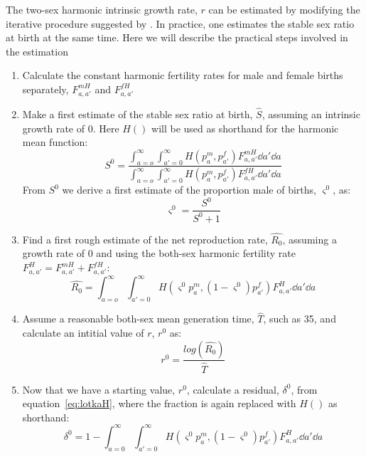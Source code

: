 The two-sex harmonic intrinsic growth rate, $r$ can be estimated by modifying
the iterative procedure suggested by \citet{coale1957new}. In practice, one
estimates the stable sex ratio at birth at the same time. Here we will describe
the practical steps involved in the estimation

\begin{enumerate}
  \item Calculate the constant harmonic fertility rates for male and female
  births separately, $F_{a,a'}^{mH}$ and $F_{a,a'}^{fH}$
  \item Make a first estimate of the stable sex ratio at birth, $\hat{S}$,
  assuming an intrinsic growth rate of 0. Here $H()$ will be used as shorthand for the
  harmonic mean function:
  \begin{equation}
  S^0 = \frac{\int_{a=o}^\infty \int_{a'=0}^\infty H(p_a^m, p_{a'}^f)
  F_{a,a'}^{mH} \dd a' \dd a }{\int_{a=o}^\infty \int_{a'=0}^\infty H(p_a^m, p_{a'}^f)
  F_{a,a'}^{fH} \dd a' \dd a }
  \end{equation}
  From $S^0$ we derive a first estimate of the proportion male of
  births, $\varsigma^0$, as:
  \begin{equation}
  \varsigma^0 = \frac{S^0}{S^0+1}
  \end{equation}
  \item Find a first rough estimate of the net reproduction rate,
  $\widehat{R_0}$, assuming a growth rate of 0 and using the both-sex
  harmonic fertility rate $F_{a,a'}^{H} = F_{a,a'}^{mH} + F_{a,a'}^{fH}$:
  \begin{equation}
  \widehat{R_0} = \int_{a=o}^\infty \int_{a'=0}^\infty H(\varsigma^0 p_a^m,
  (1-\varsigma^0)p_{a'}^f) F_{a,a'}^{H} \dd a' \dd a
  \end{equation}
  \item Assume a reasonable both-sex mean generation time, $\widehat{T}$, such
  as 35, and calculate an intitial value of $r$, $r^0$ as:
  \begin{equation}
  r^0 = \frac{log(\widehat{R_0})}{\widehat{T}}
  \end{equation}
  \item Now that we have a starting value, $r^0$, calculate a residual,
  $\delta^0$, from equation~\eqref{eq:lotkaH}, where the fraction is
  again replaced with $H()$ as shorthand:
  \begin{equation}
  \delta^0 = 1 - \int _{a=0}^\infty \int _{a'=0}^\infty H(\varsigma^0 p_a^m,
  (1-\varsigma^0)p_{a'}^f) F_{a,a'}^H \dd a' \dd a
  \end{equation}

\end{enumerate}
